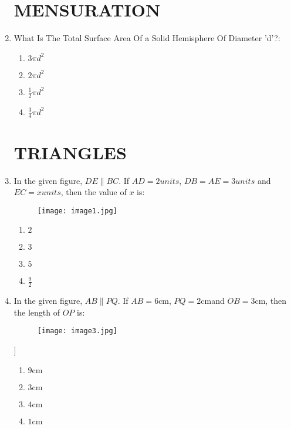 \documentclass[12pt-letter paper]{article}
\begin{document}
\begin{enumerate}
\begin{center}
\section*{MENSURATION}        
\end{center}
\item What Is The Total Surface Area Of a Solid Hemisphere Of Diameter 'd'?:    \begin{enumerate}                          
\item $ 3\pi d^2 $                        
\item $ 2\pi d^2 $                                    
\item $ \frac{1}{2}\pi d^2 $
\item $ \frac{3}{4}\pi d^2 $
\end{enumerate}                                    
\begin{center}                                    
\section*{TRIANGLES}        
\end{center}
\item In the given figure, $DE \parallel BC$. If $AD = 2 units$, $DB = AE =3 units$ and $EC = x units$, then the value of $x$ is:  
\newpage                                                                        
\begin{figure}[h!]
\centering                                            
\texttt{[image: image1.jpg]}    
\label{fig:image1}                                
\end{figure}
\begin{enumerate}
\item $ 2 $                                                          
\item $ 3 $                    
\item $ 5 $                                      
\item $ \frac{9}{2} $
\end{enumerate}
\newpage
\item In the given figure, $AB \parallel PQ$. If $AB = 6\mathrm{cm}$, $PQ =   2\mathrm{cm} $and $OB = 3\mathrm{cm}$, then the length of $OP$ is:
\begin{figure}[h!]      
\centering
\texttt{[image: image3.jpg]}  
\label{fig:image3}                              
\end{figure}]
\begin{enumerate}
\item $ 9\mathrm{cm} $                                      
\item $ 3\mathrm{cm} $        
\item $ 4\mathrm{cm} $                                    
\item $ 1\mathrm{cm} $  
\end{enumerate}
\newpage                                    
\begin{center}                                    

\end{center}
\end{enumerate}
\end{document}
